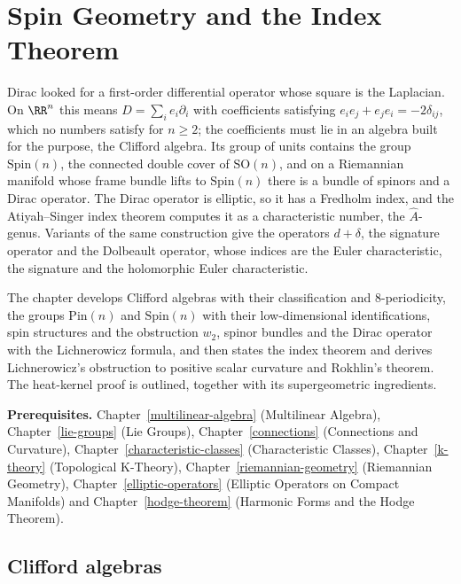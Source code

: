\chapter{Spin Geometry and the Index Theorem}\label{spin-geometry}

Dirac looked for a first-order differential operator whose square is the Laplacian. On $\RR^n$ this means $D = \sum_ie_i\partial_i$ with coefficients satisfying $e_ie_j + e_je_i = -2\delta_{ij}$, which no
numbers satisfy for $n \geq 2$; the coefficients must lie in an algebra built for the purpose, the Clifford algebra. Its group of units contains the group $\mathrm{Spin}(n)$, the connected double cover of
$\mathrm{SO}(n)$, and on a Riemannian manifold whose frame bundle lifts to $\mathrm{Spin}(n)$ there is a bundle of spinors and a Dirac operator. The Dirac operator is elliptic, so it has a Fredholm index, and
the Atiyah--Singer index theorem computes it as a characteristic number, the $\hat{A}$-genus. Variants of the same construction give the operators $d + \delta$, the signature operator and the Dolbeault
operator, whose indices are the Euler characteristic, the signature and the holomorphic Euler characteristic.

The chapter develops Clifford algebras with their classification and $8$-periodicity, the groups $\mathrm{Pin}(n)$ and $\mathrm{Spin}(n)$ with their low-dimensional identifications, spin structures and the
obstruction $w_2$, spinor bundles and the Dirac operator with the Lichnerowicz formula, and then states the index theorem and derives Lichnerowicz's obstruction to positive scalar curvature and Rokhlin's
theorem. The heat-kernel proof is outlined, together with its supergeometric ingredients.

\noindent\textbf{Prerequisites.} Chapter~\ref{multilinear-algebra} (Multilinear Algebra), Chapter~\ref{lie-groups} (Lie Groups), Chapter~\ref{connections} (Connections and Curvature),
Chapter~\ref{characteristic-classes} (Characteristic Classes), Chapter~\ref{k-theory} (Topological K-Theory), Chapter~\ref{riemannian-geometry} (Riemannian Geometry),
Chapter~\ref{elliptic-operators} (Elliptic Operators on Compact Manifolds) and Chapter~\ref{hodge-theorem} (Harmonic Forms and the Hodge Theorem).

\section{Clifford algebras}\label{spin-geometry:section-clifford-algebras}

